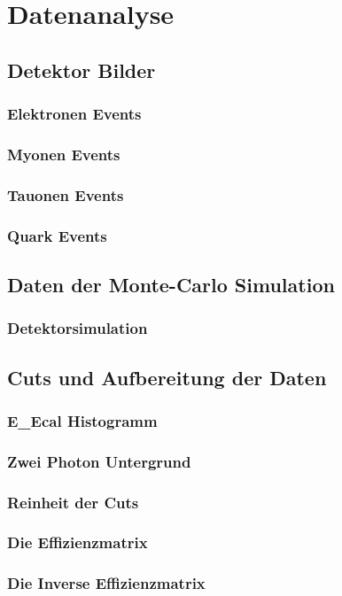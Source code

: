 \section{Datenanalyse}
\subsection{Detektor Bilder}
\begin{frame}
	\frametitle{Elektronen Events}
	
\end{frame}

\begin{frame}
	\frametitle{Myonen Events}
	
\end{frame}
\begin{frame}
	\frametitle{Tauonen Events}
	
\end{frame}
\begin{frame}
	\frametitle{Quark Events}
	
\end{frame}
\subsection{Daten der Monte-Carlo Simulation}
\begin{frame}
	\frametitle{Detektorsimulation}
	
\end{frame}
\subsection{Cuts und Aufbereitung der Daten}
\begin{frame}
	\frametitle{E\_Ecal Histogramm}
	
\end{frame}

\begin{frame}
	\frametitle{Zwei Photon Untergrund}
	
\end{frame}

\begin{frame}
	\frametitle{Reinheit der Cuts}
	
\end{frame}
\begin{frame}
	\frametitle{Die Effizienzmatrix}
	
\end{frame}
\begin{frame}
	\frametitle{Die Inverse Effizienzmatrix}
	
\end{frame}

